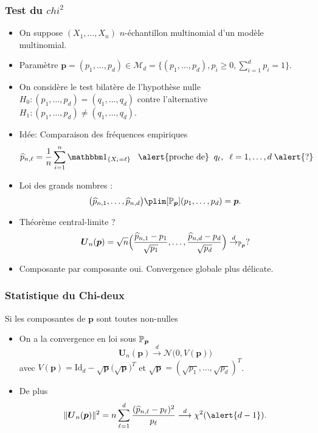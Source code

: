 \begin{frame}
\frametitle{Test du $chi^2$}
\begin{itemize}
\item On suppose $(X_1,\dots,X_n)$ $n$-échantillon multinomial d'un modèle multinomial.
\item \alert{Paramètre} $\mathbf{p}= (p_1,\dots,p_d) \in \mathcal{M}_d= \{ (p_1, \dots, p_d), p_i \geq 0, \sum_{i=1}^d p_i =1 \}$.
\item On considère le test bilatère de l'hypothèse nulle  $H_0: (p_1,\dots,p_d)= (q_1,\dots,q_d)$ contre l'alternative $H_1: (p_1,\dots,p_d) \ne (q_1,\dots,q_d)$.
\item \alert{Idée:} Comparaison des fréquences empiriques
$$\widehat p_{n,\ell}=\frac{1}{n}\sum_{i=1}^n \indi{X_i=\ell}\;\;\;\text{\alert{proche de}}\;\;q_\ell,\;\;\ell=1,\ldots, d\; \alert{?}$$
\item Loi des grands nombres :
$$\big(\widehat p_{n,1},\ldots, \widehat p_{n,d}\big) \plim[\PP_{{\boldsymbol p}}] (p_1,\ldots, p_d)={\boldsymbol p}.$$
\item \alert{Théorème central-limite ?}
$${\boldsymbol{U}_n}(\boldsymbol{p})=\sqrt{n}\Big(\frac{\widehat p_{n,1}-p_1}{\sqrt{p_1}},\ldots, \frac{\widehat p_{n,d}-p_d}{\sqrt{p_d}}\Big) \stackrel{d}{\rightarrow}_{\operatorname{{\mathbb P}}_{\boldsymbol{p}}} ?$$
\item Composante par composante oui. \alert{Convergence globale plus délicate}.
\end{itemize}
\end{frame}

\begin{frame}
\frametitle{Statistique du Chi-deux}
\begin{prop}
Si les composantes de $\boldsymbol{p}$ sont toutes non-nulles
\begin{itemize}
\item On a la \alert{convergence en loi} sous $\operatorname{{\mathbb P}}_{\boldsymbol{p}}$
$${\boldsymbol{U}_n}(\boldsymbol{p})\stackrel{d}{\longrightarrow} {\mathcal N}\big(0,V(\boldsymbol{p})\big)$$
avec $V(\boldsymbol{p}) = \mathrm{Id}_d-\sqrt{\boldsymbol{p}}\big(\sqrt{\boldsymbol{p}}\big)^T$ et $\sqrt{\boldsymbol{p}} = (\sqrt{p_1},\ldots, \sqrt{p_d})^T$.
\item \alert{De plus}
$$\|{\boldsymbol{U}_n}(\boldsymbol{p})\|^2 = n\sum_{\ell=1}^d \frac{(\widehat p_{n,\ell}-p_\ell)^2}{p_\ell} \stackrel{d}{\longrightarrow} \chi^2(\alert{d-1}).$$
\end{itemize}
\end{prop}
\end{frame}

